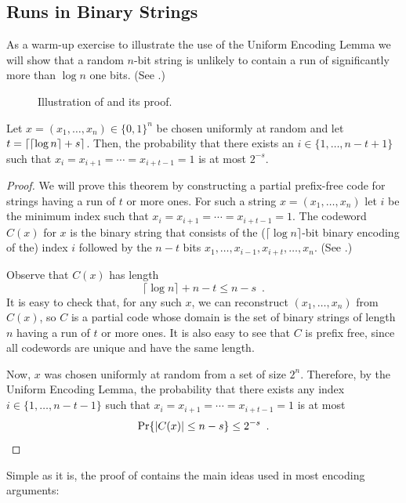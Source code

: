 \documentclass{patmorin}
\begin{document}
\subsection{Runs in Binary Strings}

As a warm-up exercise to illustrate the use of the Uniform Encoding
Lemma we will show that a random $n$-bit string is unlikely to contain
a run of significantly more than $\log n$ one bits.  (See
.)

\begin{figure}
  \caption{Illustration of  and its proof.}
\end{figure}

\begin{thm}
  Let $x=(x_1,\ldots,x_n)\in\{0,1\}^n$ be chosen uniformly at random
  and let $t = {\lceil {\lceil \log n \rceil} + s \rceil}$. Then, the probability that
  there exists an $i\in\{1,\ldots,n-t+1\}$ such that
  $x_i=x_{i+1}=\cdots=x_{i+t-1}=1$ is at most $2^{-s}$.
\end{thm}

\begin{proof}
  We will prove this theorem by constructing a partial prefix-free
  code for strings having a run of $t$ or more ones.  For such a
  string $x=(x_1,\ldots,x_n)$ let $i$ be the minimum index such that
  $x_i=x_{i+1}=\cdots=x_{i+t-1}=1$. The codeword $C(x)$ for $x$ is the
  binary string that consists of the ($\lceil\log n\rceil$-bit binary
  encoding of the) index $i$ followed by the $n-t$ bits
  $x_1,\ldots,x_{i-1},x_{i+t},\ldots,x_n$. (See .)

  Observe that $C(x)$ has length 
  \[
    \lceil\log n \rceil + n - t \le n-s \enspace .
  \]
  It is easy to check that, for any such $x$, we can reconstruct
  $(x_1,\ldots,x_n)$ from $C(x)$, so $C$ is a partial code whose
  domain is the set of binary strings of length $n$ having a run of
  $t$ or more ones.  It is also easy to see that $C$ is prefix free,
  since all codewords are unique and have the same length.

  Now, $x$ was chosen uniformly at random from a set of size $2^{n}$.
  Therefore, by the Uniform Encoding Lemma, the probability that there
  exists any index $i\in\{1,\ldots,n-t-1\}$ such that
  $x_i=x_{i+1}=\cdots=x_{i+t-1}=1$ is at most
  \[
    \Pr\{|C(x)|\le n-s\} \le 2^{-s} \enspace . \qedhere 
  \]
\end{proof}

Simple as it is, the proof of  contains the main ideas
used in most encoding arguments:
\end{document}
